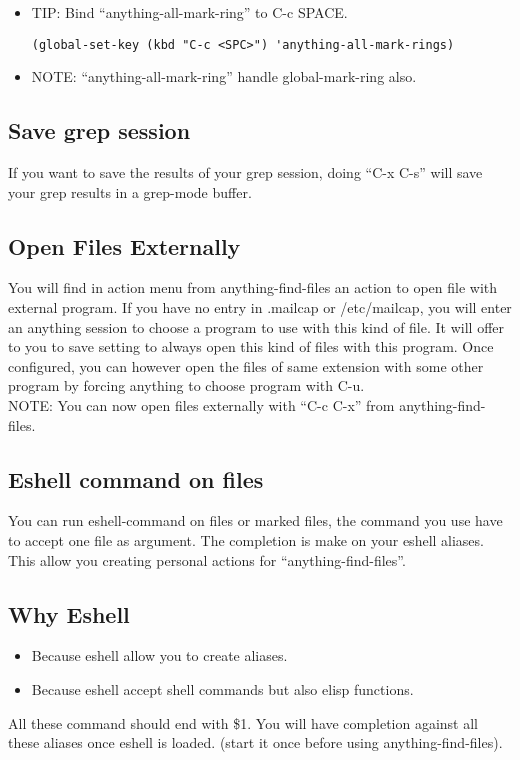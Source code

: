 \documentclass[a4paper,11pt]{article}
\begin{document}
\begin{itemize}
\item TIP: Bind ``anything-all-mark-ring'' to C-c SPACE.
\begin{verbatim}
(global-set-key (kbd "C-c <SPC>") 'anything-all-mark-rings)
\end{verbatim}
\end{itemize}

\begin{itemize}
\item NOTE: ``anything-all-mark-ring'' handle global-mark-ring also.
\end{itemize}

\subsection{Save grep session}
\label{sec:save-grep-session}
If you want to save the results of your grep session, doing ``C-x C-s'' will save your grep results
in a grep-mode buffer. 

\subsection{Open Files Externally}
\label{sec:open-files-extern}
You will find in action menu from anything-find-files an action to open file with external program.
If you have no entry in .mailcap or /etc/mailcap, you will enter an anything session to choose a program
to use with this kind of file.
It will offer to you to save setting to always open this kind of files with this program.
Once configured, you can however open the files of same extension with some other program by forcing anything
to choose program with C-u.\\

NOTE: You can now open files externally with ``C-c C-x'' from anything-find-files.

\subsection{Eshell command on files}
\label{sec:eshell-command-files}
You can run eshell-command on files or marked files, the command you use have to accept
one file as argument.
The completion is make on your eshell aliases.
This allow you creating personal actions for ``anything-find-files''.

\subsection{Why Eshell}
\label{sec:why-eshell}
\begin{itemize}
\item Because eshell allow you to create aliases.
\end{itemize}
\begin{itemize}
\item Because eshell accept shell commands but also elisp functions.
\end{itemize}
All these command should end with \$1.
You will have completion against all these aliases once eshell is loaded.
(start it once before using anything-find-files).
\end{document}
